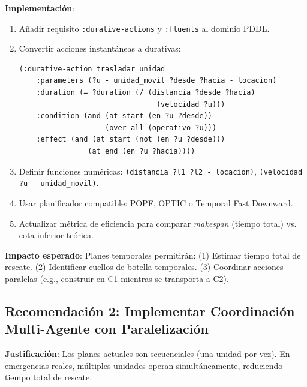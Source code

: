\documentclass[conference]{IEEEtran}
\begin{document}
    \textbf{Implementación}:
    \begin{enumerate}[leftmargin=*,itemsep=1pt]
    \item Añadir requisito \texttt{:durative-actions} y \texttt{:fluents} al dominio PDDL.
    \item Convertir acciones instantáneas a durativas:
    \begin{lstlisting}[style=pddlstyle]
    (:durative-action trasladar_unidad
    :parameters (?u - unidad_movil ?desde ?hacia - locacion)
    :duration (= ?duration (/ (distancia ?desde ?hacia) 
                                (velocidad ?u)))
    :condition (and (at start (en ?u ?desde))
                    (over all (operativo ?u)))
    :effect (and (at start (not (en ?u ?desde)))
                (at end (en ?u ?hacia))))
    \end{lstlisting}
    \item Definir funciones numéricas: \texttt{(distancia ?l1 ?l2 - locacion)}, \texttt{(velocidad ?u - unidad\_movil)}.
    \item Usar planificador compatible: POPF, OPTIC o Temporal Fast Downward.
    \item Actualizar métrica de eficiencia para comparar \textit{makespan} (tiempo total) vs. cota inferior teórica.
    \end{enumerate}

    \textbf{Impacto esperado}: Planes temporales permitirán: (1) Estimar tiempo total de rescate. (2) Identificar cuellos de botella temporales. (3) Coordinar acciones paralelas (e.g., construir en C1 mientras se transporta a C2).

    \subsection{Recomendación 2: Implementar Coordinación Multi-Agente con Paralelización}

    \textbf{Justificación}: Los planes actuales son secuenciales (una unidad por vez). En emergencias reales, múltiples unidades operan simultáneamente, reduciendo tiempo total de rescate.
\end{document}
